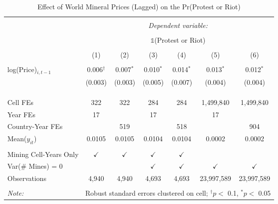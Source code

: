 
\begin{table}[ht!] \centering 
  \caption{Effect of World Mineral Prices (Lagged) on the Pr(Protest or Riot)} 
  \label{tab:did_priceLag_acled} 
\begin{tabular}{@{\extracolsep{0pt}}lcccccc} 
\\[-1.8ex]\hline 
\hline \\[-1.8ex] 
 & \multicolumn{6}{c}{\textit{Dependent variable:}} \\ 
\cline{2-7} 
\\[-1.8ex] & \multicolumn{6}{c}{$\mathbb{1}$(Protest or Riot)} \\ 
\\[-1.8ex] & (1) & (2) & (3) & (4) & (5) & (6)\\ 
\hline \\[-1.8ex] 
 log(Price)$_{i,t-1}$ & 0.006$^{\dagger}$ & 0.007$^{*}$ & 0.010$^{*}$ & 0.014$^{*}$ & 0.013$^{*}$ & 0.012$^{*}$ \\ 
  & (0.003) & (0.003) & (0.005) & (0.007) & (0.004) & (0.004) \\ 
  & & & & & & \\ 
\hline \\[-1.8ex] 
\hline \\[-1.8ex] Cell FEs & 322 & 322 & 284 & 284 & 1,499,840 & 1,499,840 \\ 
Year FEs & 17 &  & 17 &  & 17 &  \\ 
Country-Year FEs &  & 519 &  & 518 &  & 904 \\ 
Mean($y_{it}$) & 0.0105 & 0.0105 & 0.0104 & 0.0104 & 0.0002 & 0.0002 \\ 
\hline \\[-1.8ex] Mining Cell-Years Only & $\checkmark$ & $\checkmark$ & $\checkmark$ & $\checkmark$ &  &  \\ 
Var(\# Mines) = 0 &  &  & $\checkmark$ & $\checkmark$ & $\checkmark$ & $\checkmark$ \\ 
Observations & 4,940 & 4,940 & 4,693 & 4,693 & 23,997,589 & 23,997,589 \\ 
\hline 
\hline \\[-1.8ex] 
\textit{Note:}  & \multicolumn{6}{r}{Robust standard errors clustered on cell; $^{\dagger} p <$ 0.1, $^*p <$ 0.05} \\ 
\end{tabular} 
\end{table} 
